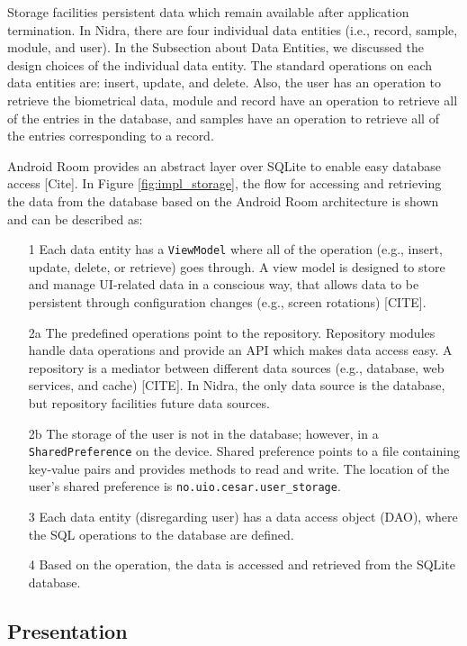 Storage facilities persistent data which remain available after application termination. In Nidra, there are four individual data entities (i.e., record, sample, module, and user). In the Subsection about Data Entities, we discussed the design choices of the individual data entity. The standard operations on each data entities are: insert, update, and delete. Also, the user has an operation to retrieve the biometrical data, module and record have an operation to retrieve all of the entries in the database, and samples have an operation to retrieve all of the entries corresponding to a record. 

Android Room provides an abstract layer over SQLite to enable easy database access [Cite]. In Figure \ref{fig:impl_storage}, the flow for accessing and retrieving the data from the database based on the Android Room architecture is shown and can be described as:

\begin{itemize}
	\item[1] Each data entity has a \verb|ViewModel| where all of the operation (e.g., insert, update, delete, or retrieve) goes through.  A view model is designed to store and manage UI-related data in a conscious way, that allows data to be persistent through configuration changes (e.g., screen rotations) [CITE]. 
 	\item[2a] The predefined operations point to the repository. Repository modules handle data operations and provide an API  which makes data access easy. A repository is a mediator between different data sources (e.g., database, web services, and cache) [CITE]. In Nidra, the only data source is the database, but repository facilities future data sources. 
	\item[2b] The storage of the user is not in the database; however, in a \verb|SharedPreference| on the device. Shared preference points to a file containing key-value pairs and provides methods to read and write. The location of the user's shared preference is \verb|no.uio.cesar.user_storage|. 
	\item[3] Each data entity (disregarding user) has a data access object (DAO), where the SQL operations to the database are defined. 
	\item[4] Based on the operation, the data is accessed and retrieved from the SQLite database.
\end{itemize}




\subsection{Presentation}



